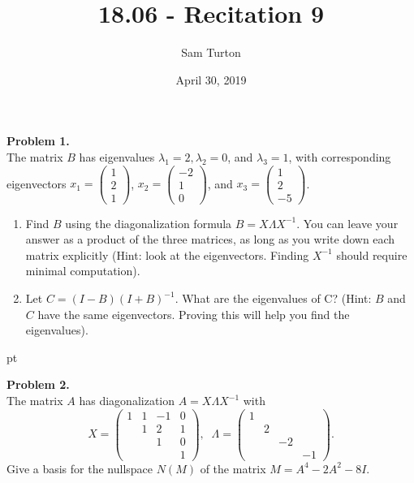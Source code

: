\documentclass[11pt]{article}
\title{18.06 - Recitation 9}
\author{Sam Turton}
\date{April 30, 2019}
\begin{document}
\maketitle

\noindent \textbf{Problem 1.}\\
The matrix $B$ has eigenvalues $\lambda_1 = 2, \lambda_2 = 0$, and $\lambda_3 = 1$, with corresponding eigenvectors $x_1 = \begin{pmatrix} 1 \\ 2 \\ 1 \end{pmatrix}$, $x_2 = \begin{pmatrix} -2 \\ 1 \\ 0 \end{pmatrix}$, and $x_3 = \begin{pmatrix} 1 \\ 2 \\ -5 \end{pmatrix}$.
\begin{enumerate}
\item Find $B$ using the diagonalization formula $B = X\Lambda X^{-1}$. You can leave your answer as a product of the three matrices, as long as you write down each matrix explicitly (Hint: look at the eigenvectors. Finding $X^{-1}$ should require minimal computation).
\item Let $C=(I-B)(I+B)^{-1}$. What are the eigenvalues of C? (Hint: $B$ and $C$ have the same eigenvectors. Proving this will help you find the eigenvalues).
\end{enumerate}

 pt 

\noindent \textbf{Problem 2.}\\
The matrix $A$ has diagonalization $A=X\Lambda X^{-1}$ with 
$$X = \begin{pmatrix} 1 & 1 & -1 & 0 \\ & 1 & 2 & 1 \\ & & 1 & 0 \\ & & & 1 \end{pmatrix}, \;\; \Lambda = \begin{pmatrix} 1 & & & \\ & 2 & & \\ & & -2 & \\ & & & -1 \end{pmatrix}.$$
Give a basis for the nullspace $N(M)$ of the matrix $M = A^4 - 2A^2 - 8I$.

\newpage
\end{document}
